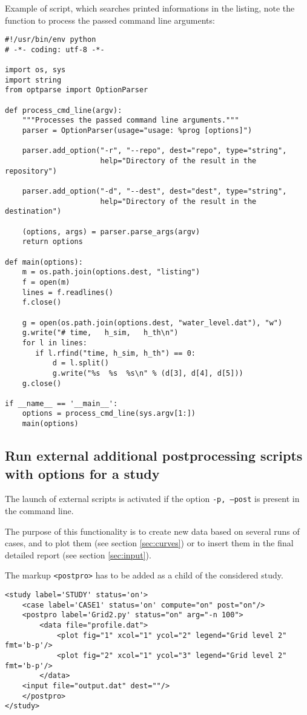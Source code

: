 \documentclass[a4paper,10pt,twoside]{csshortdoc}
\begin{document}
Example of script, which searches printed informations in the listing,
note the function to process the passed command line arguments:
\small
\begin{verbatim}
#!/usr/bin/env python
# -*- coding: utf-8 -*-

import os, sys
import string
from optparse import OptionParser

def process_cmd_line(argv):
    """Processes the passed command line arguments."""
    parser = OptionParser(usage="usage: %prog [options]")

    parser.add_option("-r", "--repo", dest="repo", type="string",
                      help="Directory of the result in the repository")

    parser.add_option("-d", "--dest", dest="dest", type="string",
                      help="Directory of the result in the destination")

    (options, args) = parser.parse_args(argv)
    return options

def main(options):
    m = os.path.join(options.dest, "listing")
    f = open(m)
    lines = f.readlines()
    f.close()

    g = open(os.path.join(options.dest, "water_level.dat"), "w")
    g.write("# time,   h_sim,   h_th\n")
    for l in lines:
       if l.rfind("time, h_sim, h_th") == 0:
           d = l.split()
           g.write("%s  %s  %s\n" % (d[3], d[4], d[5]))
    g.close()

if __name__ == '__main__':
    options = process_cmd_line(sys.argv[1:])
    main(options)
\end{verbatim}
\normalsize

\subsection{Run external additional postprocessing scripts with options for a study}

The launch of external scripts is activated if the option \texttt{-p, --post}
is present in the command line.

The purpose of this functionality is to create new data based on several runs of
cases, and to plot them (see section \ref{sec:curves}) or to insert them in the
final detailed report (see section \ref{sec:input}).

The markup \texttt{<postpro>} has to be added as a child of the considered study.

\small
\begin{verbatim}
<study label='STUDY' status='on'>
    <case label='CASE1' status='on' compute="on" post="on"/>
    <postpro label='Grid2.py' status="on" arg="-n 100">
        <data file="profile.dat">
            <plot fig="1" xcol="1" ycol="2" legend="Grid level 2" fmt='b-p'/>
            <plot fig="2" xcol="1" ycol="3" legend="Grid level 2" fmt='b-p'/>
        </data>
    <input file="output.dat" dest=""/>
    </postpro>
</study>
\end{verbatim}
\normalsize
\end{document}
